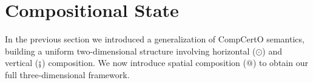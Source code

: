 \documentclass[acmsmall,screen,review,anonymous]{acmart}
\newcommand{\kw}[1]{\ensuremath{ \mathsf{#1} }}
\newcommand{\que}{\circ}
\newcommand{\ans}{\bullet}
\newcommand{\vcomp}{\fatsemi}
\begin{document}
%
%
%
%
%


\section{Compositional State} \label{sec:scomp} %

In the previous section
we introduced a generalization of CompCertO semantics,
building a uniform two-dimensional structure
involving horizontal ($\odot$) and vertical ($\vcomp$) composition.
We now introduce spatial composition ($\mathbin@$)
to obtain our full three-dimensional framework.
\end{document}
